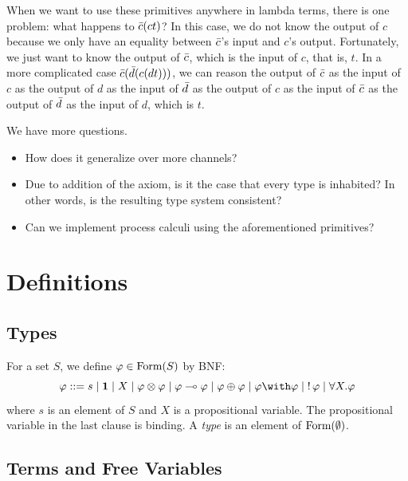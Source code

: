 When we want to use these primitives anywhere in lambda terms,
there is one problem: what happens to $\bar{c}(c t)$?
In this case, we do not know the output of $c$ because we only have an
equality between $\bar{c}$'s input and $c$'s output.
Fortunately, we just want to know the output of $\bar{c}$, which is the
input of $c$, that is, $t$.
In a more complicated case $\bar{c}(\bar{d}(c (d t)))$,
we can reason the output of $\bar{c}$ as the input of $c$ as the output of
$d$ as the input of $\bar{d}$ as the output of $c$ as the input of $\bar{c}$
as the output of $\bar{d}$ as the input of $d$, which is $t$.

We have more questions.
\begin{itemize}
 \item How does it generalize over more channels?
 \item Due to addition of the axiom, is it the case that
       every type is inhabited?  In other words,
      is the resulting type system consistent?
 \item Can we implement process calculi using the aforementioned primitives?
\end{itemize}

\section{Definitions}

\subsection{Types}
For a set $S$, we define $\varphi\in\mathop{\text{Form}}(S)$ by BNF:
\[
 \phi::=s\mid \one \mid X \mid \phi\otimes\phi\mid \phi\limp\phi\mid
 \phi\oplus\phi\mid \phi\with\phi\mid \bang\phi\mid \forall X.\phi
\]
where $s$ is an element of $S$ and $X$ is a propositional variable.
The propositional variable in the last clause is binding.
A \textit{type} is an element of $\mathop{\text{Form}}(\emptyset)$.

\subsection{Terms and Free Variables}

